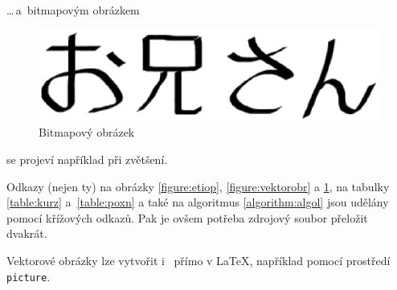 \documentclass[a4paper,11pt]{article}
\begin{document}
\medskip
\dots\,a~bitmapovým obrázkem

\begin{figure}[h]
    \begin{center}
	\includegraphics[scale=0.65]{images/oniisan2.eps}
	
	\caption{Bitmapový obrázek}
	\label{figure:rastrobr}
	\end{center}
\end{figure}

\bigskip
se projeví například při zvětšení.


Odkazy (nejen ty) na obrázky \ref{figure:etiop}, \ref{figure:vektorobr} a \ref{figure:rastrobr}, na  
tabulky \ref{table:kurz} a~\ref{table:poxn} a také na algoritmus \ref{algorithm:algol} jsou udělány pomocí 
křížových odkazů. Pak je ovšem potřeba zdrojový soubor přeložit dvakrát.
\par Vektorové obrázky lze vytvořit i~ přímo v \LaTeX, například pomocí prostředí 
\texttt{picture}.
\end{document}
